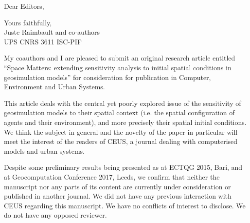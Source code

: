 \documentclass[11pt,a4paper,sans]{moderncv}        %
\begin{document}



\date{June 13, 2018}
\opening{Dear Editors,}
\closing{Yours faithfully,\\
Juste Raimbault and co-authors\\
UPS CNRS 3611 ISC-PIF
}
\makelettertitle

\justify
My coauthors and I are pleased to submit an original research article entitled ``Space Matters: extending sensitivity analysis to initial spatial conditions in geosimulation models'' for consideration for publication in Computer, Environment and Urban Systems.

This article deals with the central yet poorly explored issue of the sensitivity of geosimulation models to their spatial context (i.e. the spatial configuration of agents and their environment), and more precisely their spatial initial conditions. We think the subject in general and the novelty of the paper in particular will meet the interest of the readers of CEUS, a journal dealing with computerised models and urban systems.

Despite some preliminary results being presented as at ECTQG 2015, Bari, and at Geocomputation Conference 2017, Leeds, we confirm that neither the manuscript nor any parts of its content are currently under consideration or published in another journal. We did not have any previous interaction with CEUS regarding this manuscript. We have no conflicts of interest to disclose. We do not have any opposed reviewer.
\justify



%


\makeletterclosing
\end{document}
